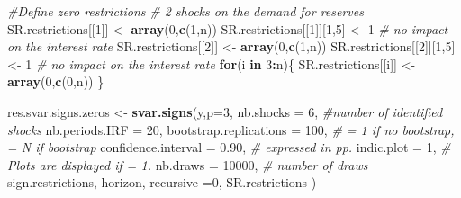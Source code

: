 \documentclass[
  11pt,
]{book}
\newenvironment{Shaded}{\begin{snugshade}}{\end{snugshade}}
\newcommand{\AttributeTok}[1]{\textcolor[rgb]{0.13,0.29,0.53}{#1}}
\newcommand{\CommentTok}[1]{\textcolor[rgb]{0.56,0.35,0.01}{\textit{#1}}}
\newcommand{\ControlFlowTok}[1]{\textcolor[rgb]{0.13,0.29,0.53}{\textbf{#1}}}
\newcommand{\DecValTok}[1]{\textcolor[rgb]{0.00,0.00,0.81}{#1}}
\newcommand{\FloatTok}[1]{\textcolor[rgb]{0.00,0.00,0.81}{#1}}
\newcommand{\FunctionTok}[1]{\textcolor[rgb]{0.13,0.29,0.53}{\textbf{#1}}}
\newcommand{\NormalTok}[1]{#1}
\newcommand{\OtherTok}[1]{\textcolor[rgb]{0.56,0.35,0.01}{#1}}
\newcommand{\SpecialCharTok}[1]{\textcolor[rgb]{0.81,0.36,0.00}{\textbf{#1}}}
\theoremstyle{definition}
\theoremstyle{definition}
\theoremstyle{definition}
\theoremstyle{definition}
\theoremstyle{remark}
\begin{document}
\begin{Shaded}
\begin{Highlighting}[]
\CommentTok{\#Define zero restrictions}
\CommentTok{\# 2 shocks on the demand for reserves}
\NormalTok{SR.restrictions[[}\DecValTok{1}\NormalTok{]] }\OtherTok{\textless{}{-}} \FunctionTok{array}\NormalTok{(}\DecValTok{0}\NormalTok{,}\FunctionTok{c}\NormalTok{(}\DecValTok{1}\NormalTok{,n))}
\NormalTok{SR.restrictions[[}\DecValTok{1}\NormalTok{]][}\DecValTok{1}\NormalTok{,}\DecValTok{5}\NormalTok{] }\OtherTok{\textless{}{-}} \DecValTok{1} \CommentTok{\# no impact on the interest rate}
\NormalTok{SR.restrictions[[}\DecValTok{2}\NormalTok{]] }\OtherTok{\textless{}{-}} \FunctionTok{array}\NormalTok{(}\DecValTok{0}\NormalTok{,}\FunctionTok{c}\NormalTok{(}\DecValTok{1}\NormalTok{,n))}
\NormalTok{SR.restrictions[[}\DecValTok{2}\NormalTok{]][}\DecValTok{1}\NormalTok{,}\DecValTok{5}\NormalTok{] }\OtherTok{\textless{}{-}} \DecValTok{1} \CommentTok{\# no impact on the interest rate}
\ControlFlowTok{for}\NormalTok{(i }\ControlFlowTok{in} \DecValTok{3}\SpecialCharTok{:}\NormalTok{n)\{}
\NormalTok{  SR.restrictions[[i]] }\OtherTok{\textless{}{-}} \FunctionTok{array}\NormalTok{(}\DecValTok{0}\NormalTok{,}\FunctionTok{c}\NormalTok{(}\DecValTok{0}\NormalTok{,n))}
\NormalTok{\}}

\NormalTok{res.svar.signs.zeros }\OtherTok{\textless{}{-}} \FunctionTok{svar.signs}\NormalTok{(y,}\AttributeTok{p=}\DecValTok{3}\NormalTok{,}
                                  \AttributeTok{nb.shocks =} \DecValTok{6}\NormalTok{, }\CommentTok{\#number of identified shocks}
                                  \AttributeTok{nb.periods.IRF =} \DecValTok{20}\NormalTok{,}
                                  \AttributeTok{bootstrap.replications =} \DecValTok{100}\NormalTok{, }\CommentTok{\# = 1 if no bootstrap, = N if bootstrap}
                                  \AttributeTok{confidence.interval =} \FloatTok{0.90}\NormalTok{, }\CommentTok{\# expressed in pp.}
                                  \AttributeTok{indic.plot =} \DecValTok{1}\NormalTok{, }\CommentTok{\# Plots are displayed if = 1.}
                                  \AttributeTok{nb.draws =} \DecValTok{10000}\NormalTok{, }\CommentTok{\# number of draws}
\NormalTok{                                  sign.restrictions,}
\NormalTok{                                  horizon,}
                                  \AttributeTok{recursive =}\DecValTok{0}\NormalTok{,}
\NormalTok{                                  SR.restrictions}
\NormalTok{)}
\end{Highlighting}
\end{Shaded}
\end{document}
